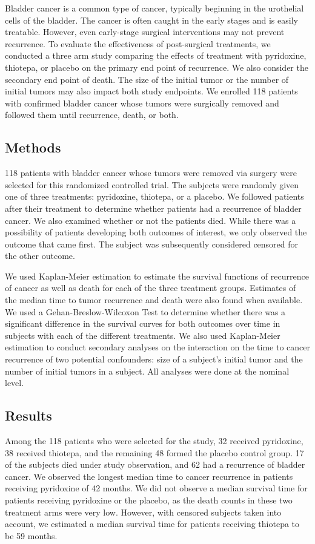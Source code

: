 \documentclass{article}
\begin{document}
	Bladder cancer is a common type of cancer, typically beginning in the urothelial cells of the bladder. The cancer is often caught in the early stages and is easily treatable. However, even early-stage surgical interventions may not prevent recurrence. To evaluate the effectiveness of post-surgical treatments, we conducted a three arm study comparing the effects of treatment with pyridoxine, thiotepa, or placebo on the primary end point of recurrence. We also consider the secondary end point of death. The size of the initial tumor or the number of initial tumors may also impact both study endpoints. We enrolled 118 patients with confirmed bladder cancer whose tumors were surgically removed and followed them until recurrence, death, or both.


	\subsection*{Methods}
	118 patients with bladder cancer whose tumors were removed via surgery were selected for this randomized controlled trial. The subjects were randomly given one of three treatments: pyridoxine, thiotepa, or a placebo. We followed patients after their treatment to determine whether patients had a recurrence of bladder cancer. We also examined whether or not the patients died. While there was a possibility of patients developing both outcomes of interest, we only observed the outcome that came first. The subject was subsequently considered censored for the other outcome.

	We used Kaplan-Meier estimation to estimate the survival functions of recurrence of cancer as well as death for each of the three treatment groups. Estimates of the median time to tumor recurrence and death were also found when available. We used a Gehan-Breslow-Wilcoxon Test to determine whether there was a significant difference in the survival curves for both outcomes over time in subjects with each of the different treatments. We also used Kaplan-Meier estimation to conduct secondary analyses on the interaction on the time to cancer recurrence of two potential confounders: size of a subject’s initial tumor and the number of initial tumors in a subject. All analyses were done at the nominal level.

	\subsection*{Results}
	Among the 118 patients who were selected for the study, 32 received pyridoxine, 38 received thiotepa, and the remaining 48 formed the placebo control group. 17 of the subjects died under study observation, and 62 had a recurrence of bladder cancer. We observed the longest median time to cancer recurrence in patients receiving pyridoxine of 42 months. We did not observe a median survival time for patients receiving pyridoxine or the placebo, as the death counts in these two treatment arms were very low. However, with censored subjects taken into account, we estimated a median survival time for patients receiving thiotepa to be 59 months.
\end{document}
